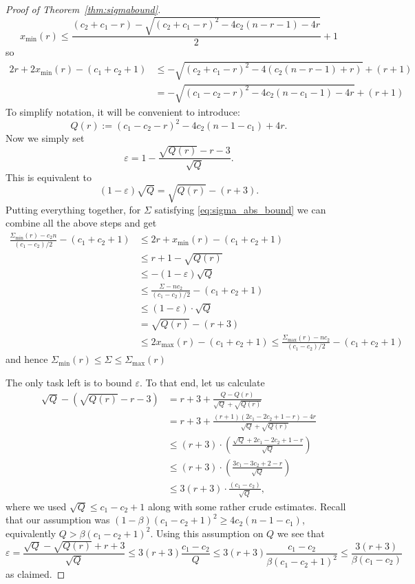 \documentclass[10pt,a4paper]{amsart}
\newcommand{\Smax}[1][r]{\Sigma_{\max}(#1)}
\newcommand{\Smin}[1][r]{\Sigma_{\min}(#1)}
\newcommand{\amax}[1][r]{x_{\max}(#1)}
\newcommand{\amin}[1][r]{x_{\min}(#1)}
\newcommand{\ep}{\varepsilon}
\begin{document}
\begin{proof}[Proof of Theorem~\ref{thm:sigmabound}]
\[\amin \leq \frac{(c_2+c_1-r)-\sqrt{(c_2+c_1-r)^2-4c_2(n-r-1)-4r}}{2} + 1\] so
\begin{align*}
     2r + 2\amin - (c_1+c_2+1) &\leq -\sqrt{(c_2+c_1-r)^2-4(c_2(n-r-1)+r)} + (r+1)\\
     &= -\sqrt{ (c_1-c_2 -r)^2 - 4c_2(n-c_1-1)-4r} + (r+1)
\end{align*}
To simplify notation, it will be convenient to introduce:
\[ Q(r) := (c_1-c_2-r)^2 - 4c_2(n-1-c_1)+4r.\]
Now we simply set
\begin{equation}\label{eq:epsilon}
\varepsilon = 1 -\frac{\sqrt{Q(r)}-r-3}{\sqrt{Q}}.
\end{equation}
This is equivalent to
\[ (1-\ep)\sqrt{Q} = \sqrt{Q(r)} -(r+3).\]
Putting everything together, for $\Sigma$ satisfying \eqref{eq:sigma_abs_bound} we can combine all the above steps and get
\begin{align*}
\frac{\Smin - c_2 n}{(c_1-c_2)/2} - (c_1+c_2+1)&\leq 2r+\amin -(c_1+c_2+1)\\ &\leq r+1 - \sqrt{Q(r)}\\ &\leq
-(1-\varepsilon)\sqrt{Q}  \\ &\leq\frac{\Sigma - n c_2}{(c_1-c_2)/2}-(c_1+c_2+1) \\ &\leq (1-\varepsilon)\cdot \sqrt{Q} \\ &= \sqrt{Q(r)}-(r+3)\\ &\leq 2\amax - (c_1+c_2+1) \leq \frac{\Smax - n c_2}{(c_1-c_2)/2}-(c_1+c_2+1)
\end{align*}
and hence $\Smin \leq \Sigma \leq \Smax$

The only task left is to bound $\varepsilon$. To that end, let us calculate
\begin{align*}\sqrt{Q}-(\sqrt{Q(r)}-r-3) &=r+3+ \frac{Q-Q(r)}{\sqrt{Q}+\sqrt{Q(r)}}\\
&= r+3+\frac{(r+1)(2c_1-2c_2+1-r)-4r}{\sqrt{Q}+\sqrt{Q(r)}}\\
&\leq (r+3) \cdot \left(\frac{\sqrt{Q}+2c_1-2c_2+1-r}{\sqrt{Q}}\right) \\
&\leq (r+3)\cdot \left(\frac{3c_1 - 3c_2 +2 -r}{\sqrt{Q}}\right)\\
&\leq 3(r+3) \cdot \frac{(c_1-c_2)}{\sqrt{Q}},
\end{align*}
where we used $\sqrt{Q} \leq c_1 - c_2 +1$ along with some rather crude estimates. Recall that our assumption was $(1-\beta)(c_1-c_2+1)^2 \geq 4c_2(n-1-c_1)$, equivalently $Q > \beta (c_1-c_2+1)^2$. Using this assumption on $Q$ we see that
\[ \varepsilon = \frac{\sqrt{Q}-\sqrt{Q(r)}+r+3}{\sqrt{Q}} \leq 3(r+3) \frac{c_1-c_2}{Q} \leq 3(r+3) \frac{c_1-c_2}{\beta (c_1-c_2+1)^2} \leq \frac{3(r+3)}{\beta(c_1-c_2)}\]
as claimed.
\end{proof}
\end{document}
